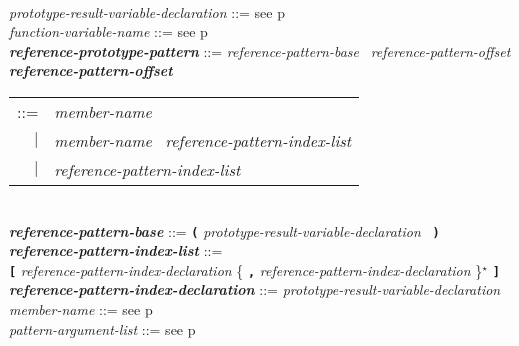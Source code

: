 \documentclass[12pt]{article}
\newcommand{\TT}[1]{{\tt \bfseries #1}}
\newcommand{\STAR}{{\Large $^\star$}}
\newcommand{\emkey}[1]{{\em \bfseries #1}}
\newcommand{\pagref}[1]{p\pageref{#1}}
\newenvironment{indpar}[1][0.3in]%
	{\begin{list}{}%
		     {\setlength{\itemsep}{0in}%
		      \setlength{\topsep}{0in}%
		      \setlength{\parsep}{1ex}%
		      \setlength{\labelwidth}{#1}%
		      \setlength{\leftmargin}{#1}%
		      \addtolength{\leftmargin}{\labelsep}}%
	 \item}%
	{\end{list}}
\begin{document}
\begin{indpar}[0.1in]
\\[0.5ex]
{\em prototype-result-variable-declaration} ::=
    see \pagref{PROTOTYPE-RESULT-VARIABLE-DECLARATION}
\\[0.5ex]
{\em function-variable-name} ::= see \pagref{FUNCTION-VARIABLE-NAME}
\\[0.5ex]
\emkey{reference-prototype-pattern}\label{REFERENCE-PROTOTYPE-PATTERN}
    ::= {\em reference-pattern-base}~ {\em reference-pattern-offset}
\\[0.5ex]
\emkey{reference-pattern-offset}\label{REFERENCE-PATTERN-OFFSET}
    \begin{tabular}[t]{rl}
    ::= & {\em member-name} \\
    $|$ & {\em member-name}~ {\em reference-pattern-index-list} \\
    $|$ & {\em reference-pattern-index-list} \\
    \end{tabular}
\\[0.5ex]
\emkey{reference-pattern-base} ::=
    \TT{(} {\em prototype-result-variable-declaration}~ \TT{)}
\\[0.5ex]
\emkey{reference-pattern-index-list} ::= \\
\hspace*{0.5in}
    \TT{[} {\em reference-pattern-index-declaration}
           \{ \TT{,} {\em reference-pattern-index-declaration} \}\STAR{} \TT{]}
\\[0.5ex]
\emkey{reference-pattern-index-declaration} ::=
    {\em prototype-result-variable-declaration}
\\[0.5ex]
{\em member-name} ::= see \pagref{MEMBER-NAME}
\\[0.5ex]
{\em pattern-argument-list} ::= see \pagref{PATTERN-ARGUMENT-LIST}
\end{indpar}
\end{document}
